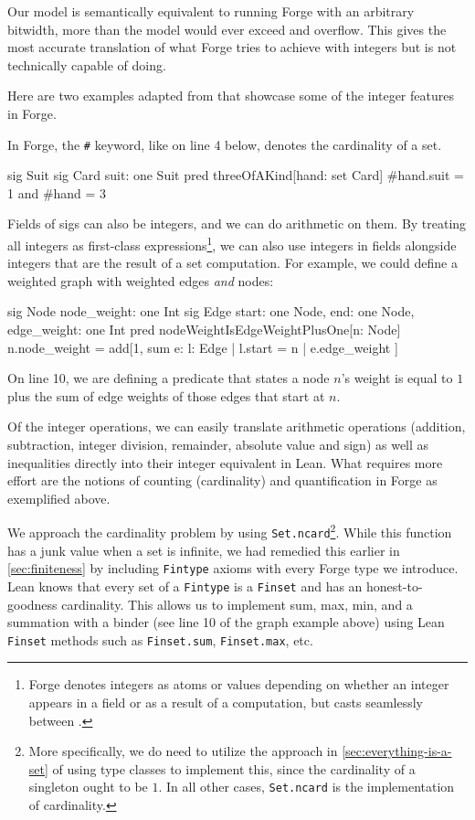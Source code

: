 Our model is semantically equivalent to running Forge with an arbitrary bitwidth, more than the model would ever exceed and overflow. This gives the most accurate translation of what Forge tries to achieve with integers but is not technically capable of doing. 

Here are two examples adapted from \cite{jackson2012software} that showcase some of the integer features in Forge. 

In Forge, the \texttt{\#} keyword, like on line 4 below, denotes the cardinality of a set. 

\begin{forge}
sig Suit {}
sig Card { suit: one Suit }
pred threeOfAKind[hand: set Card] {
  #hand.suit = 1 and #hand = 3
}
\end{forge}

Fields of sigs can also be integers, and we can do arithmetic on them. By treating all integers as first-class expressions\footnote{Forge denotes integers as atoms or values depending on whether an integer appears in a field or as a result of a computation, but casts seamlessly between \cite{forge-docs,nelson2024artifact}.}, we can also use integers in fields alongside integers that are the result of a set computation. For example, we could define a weighted graph with weighted edges \emph{and} nodes:

\begin{forge}
sig Node {
  node_weight: one Int
}
sig Edge {
  start: one Node,
  end: one Node,
  edge_weight: one Int
}
pred nodeWeightIsEdgeWeightPlusOne[n: Node] {
  n.node_weight = add[1, sum e: { l: Edge | l.start = n } | { e.edge_weight }]
}
\end{forge}

On line 10, we are defining a predicate that states a node $n$'s weight is equal to $1$ plus the sum of edge weights of those edges that start at $n$. 

Of the integer operations, we can easily translate arithmetic operations (addition, subtraction, integer division, remainder, absolute value and sign) as well as inequalities directly into their integer equivalent in Lean. What requires more effort are the notions of counting (cardinality) and quantification in Forge as exemplified above. 

We approach the cardinality problem by using \texttt{Set.ncard}\footnote{More specifically, we do need to utilize the approach in \cref{sec:everything-is-a-set} of using type classes to implement this, since the cardinality of a singleton ought to be $1$. In all other cases, \texttt{Set.ncard} is the implementation of cardinality.}. While this function has a junk value when a set is infinite, we had remedied this earlier in \cref{sec:finiteness} by including \texttt{Fintype} axioms with every Forge type we introduce. Lean knows that every set of a \texttt{Fintype} is a \texttt{Finset} and has an honest-to-goodness cardinality. This allows us to implement sum, max, min, and a summation with a binder (see line 10 of the graph example above) using Lean \texttt{Finset} methods such as \texttt{Finset.sum}, \texttt{Finset.max}, etc. 

